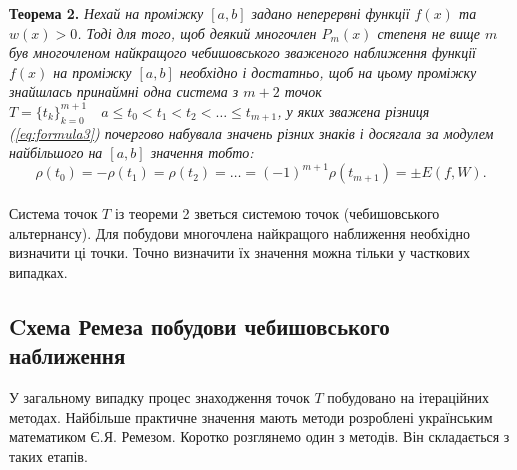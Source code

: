 \documentclass[ukrainian,14pt]{extarticle}
\def\ab{[a,b]}
\begin{document}
\noindent
\textbf{Теорема 2.}\textit{
Нехай на проміжку $[a,b]$ задано неперервні функції $f(x)$ та $w(x) > 0$.
Тоді для того, щоб деякий многочлен $P_m(x)$ степеня не вище $m$ був многочленом найкращого чебишовського зваженого наближення функції $f(x)$ на проміжку $\ab$ необхідно і достатньо, щоб на цьому проміжку знайшлась принаймні одна система з $m+2$ точок \\ $T=\{t_k\}_{k=0}^{m+1} \quad a \leq t_0 < t_1 < t_2 < \ldots \leq t_{m+1}$, у яких зважена різниця (\ref{eq:formula3}) почергово набувала значень різних знаків і досягала за модулем найбільшого на $\ab$ значення тобто:
}
\begin{equation}\label{eq:formula5}
\rho(t_0) = -\rho(t_1) = \rho(t_2) = \ldots = (-1)^{m+1}\rho(t_{m+1}) = \pm E(f,W).
\end{equation}\\


Система точок $T$ із теореми 2 зветься системою точок (чебишовського альтернансу). Для побудови многочлена найкращого наближення  необхідно визначити ці точки. Точно визначити їх значення можна тільки у часткових випадках. 

\subsection{Cхема Ремеза побудови чебишовського наближення}

У загальному випадку процес знаходження точок $T$ побудовано на ітераційних методах. Найбільше практичне значення мають методи розроблені українським математиком Є.Я. Ремезом. Коротко розглянемо один з методів. Він складається з таких етапів.
\end{document}
